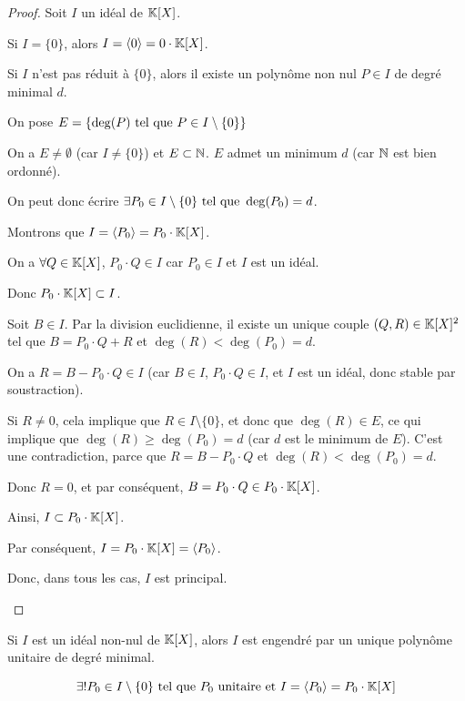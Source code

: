 \documentclass[12pt, a4paper]{report}
\begin{document}
\begin{proof}
    Soit $I$ un idéal de $\mathbb{K}[X]$.

    \begin{outline}
        \1 Si $I = \{0\}$, alors $I = \langle 0 \rangle = 0\cdot\mathbb{K}[X]$.

        \1 Si $I$ n'est pas réduit à $\{0\}$, alors il existe un polynôme non nul $P \in I$ de degré minimal $d$.

        \2 On pose $E = \{\deg(P) \text{ tel que } P \in I\setminus\{0\}\}$

        \2 On a $E \ne \emptyset$ (car $I \ne \{0\}$) et $E \subset \mathbb{N}$. $E$ admet un minimum $d$ (car $\mathbb{N}$ est bien ordonné).

        \2 On peut donc écrire $\exists P_0 \in I \setminus \{0\} \text{ tel que } \deg(P_0) = d$.

        \2 Montrons que $I = \langle P_0 \rangle = P_0 \cdot \mathbb{K}[X]$.

        \2 On a $\forall Q \in \mathbb{K}[X]$, $P_0 \cdot Q \in I$ car $P_0 \in I$ et $I$ est un idéal.

        \2 Donc $P_0 \cdot \mathbb{K}[X] \subset I$.

        \2 Soit $B \in I$. Par la division euclidienne, il existe un unique couple $(Q,R) \in \mathbb{K}[X]^2$ tel que $B = P_0 \cdot Q + R$ et $\deg(R) < \deg(P_0) = d$.

        \2 On a $R = B - P_0 \cdot Q \in I$ (car $B \in I$, $P_0 \cdot Q \in I$, et $I$ est un idéal, donc stable par soustraction).

        \3 Si $R \ne 0$, cela implique que $R \in I\setminus\{0\}$, et donc que $\deg(R) \in E$, ce qui implique que $\deg(R) \ge \deg(P_0) = d$ (car $d$ est le minimum de $E$). C'est une contradiction, parce que $R = B- P_0 \cdot Q$ et $\deg(R) < \deg(P_0) = d$.

        \3 Donc $R = 0$, et par conséquent, $B = P_0 \cdot Q \in P_0 \cdot \mathbb{K}[X]$.

        \2 Ainsi, $I \subset P_0 \cdot \mathbb{K}[X]$.

        \2 Par conséquent, $I = P_0 \cdot \mathbb{K}[X] = \langle P_0 \rangle$.

        \1 Donc, dans tous les cas, $I$ est principal.
    \end{outline}
\end{proof}

\begin{remark}
    Si $I$ est un idéal non-nul de $\mathbb{K}[X]$, alors $I$ est engendré par un unique polynôme unitaire de degré minimal.

    $$\exists! P_0 \in I \setminus \{0\} \text{ tel que } P_0 \text{ unitaire et } I = \langle P_0 \rangle = P_0 \cdot \mathbb{K}[X]$$
\end{remark}
\end{document}
